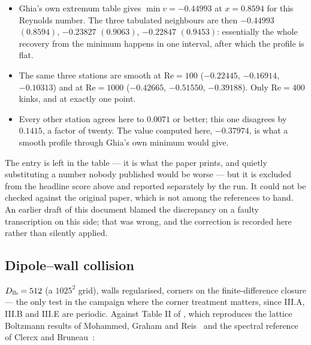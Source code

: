 \documentclass[11pt,a4paper]{article}
\begin{document}
\begin{itemize}\itemsep1pt
\item Ghia's own extremum table gives $\min v = -0.44993$ at $x = 0.8594$ for
      this Reynolds number. The three tabulated neighbours are then $-0.44993$
      $(0.8594)$, $-0.23827$ $(0.9063)$, $-0.22847$ $(0.9453)$: essentially the
      whole recovery from the minimum happens in one interval, after which the
      profile is flat.
\item The same three stations are smooth at $\mathrm{Re}=100$ ($-0.22445$,
      $-0.16914$, $-0.10313$) and at $\mathrm{Re}=1000$ ($-0.42665$, $-0.51550$,
      $-0.39188$). Only $\mathrm{Re}=400$ kinks, and at exactly one point.
\item Every other station agrees here to $0.0071$ or better; this one disagrees
      by $0.1415$, a factor of twenty. The value computed here, $-0.37974$, is
      what a smooth profile through Ghia's own minimum would give.
\end{itemize}

\noindent The entry is left in the table --- it is what the paper prints, and
quietly substituting a number nobody published would be worse --- but it is
excluded from the headline score above and reported separately by the run. It
could not be checked against the original paper, which is not among the
references to hand. An earlier draft of this document blamed the discrepancy on
a faulty transcription on this side; that was wrong, and the correction is
recorded here rather than silently applied.

\subsection{Dipole--wall collision}

$D_{\rm lb}=512$ (a $1025^2$ grid), walls regularised, corners on the
finite-difference closure --- the only test in the campaign where the corner
treatment matters, since III.A, III.B and III.E are periodic. Against Table II
of \cite{derosis2020}, which reproduces the lattice Boltzmann results of
Mohammed, Graham and Reis~\cite{mohammed2018} and the spectral reference of
Clercx and Bruneau~\cite{clercx2006}:
\end{document}
